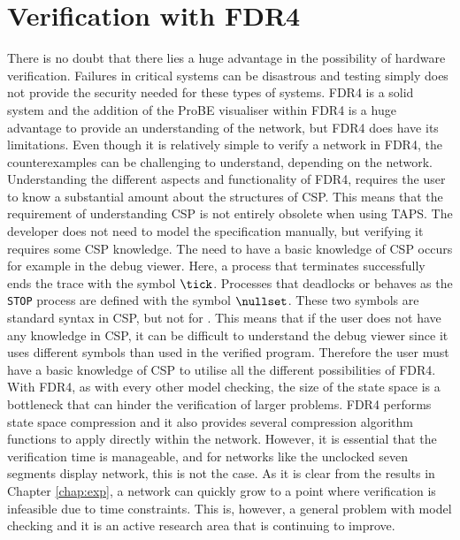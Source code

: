 \section{Verification with FDR4}
There is no doubt that there lies a huge advantage in the possibility of hardware verification. Failures in critical systems can be disastrous and testing simply does not provide the security needed for these types of systems. FDR4 is a solid system and the addition of the ProBE visualiser within FDR4 is a huge advantage to provide an understanding of the network, but FDR4 does have its limitations. Even though it is relatively simple to verify a network in FDR4, the counterexamples can be challenging to understand, depending on the network. Understanding the different aspects and functionality of FDR4, requires the user to know a substantial amount about the structures of CSP. This means that the requirement of understanding CSP is not entirely obsolete when using TAPS. The developer does not need to model the specification manually, but verifying it requires some CSP knowledge. The need to have a basic knowledge of CSP occurs for example in the debug viewer. Here, a process that terminates successfully ends the trace with the symbol $\tick$. Processes that deadlocks or behaves as the \texttt{STOP} process are defined with the symbol $\nullset$. These two symbols are standard syntax in CSP, but not for \cspm{}. This means that if the user does not have any knowledge in CSP, it can be difficult to understand the debug viewer since it uses different symbols than used in the verified \cspm{} program. Therefore the user must have a basic knowledge of CSP to utilise all the different possibilities of FDR4. \\

With FDR4, as with every other model checking, the size of the state space is a bottleneck that can hinder the verification of larger problems. FDR4 performs state space compression and it also provides several compression algorithm functions to apply directly within the \cspm{} network.
However, it is essential that the verification time is manageable, and for networks like the unclocked seven segments display network, this is not the case. As it is clear from the results in Chapter \ref{chap:exp}, a network can quickly grow to a point where verification is infeasible due to time constraints. This is, however, a general problem with model checking and it is an active research area that is continuing to improve.